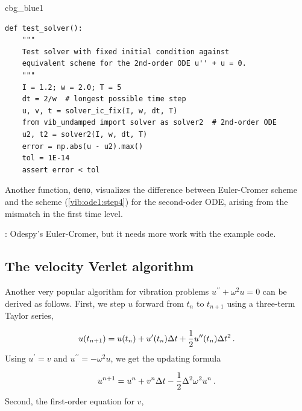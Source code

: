 \documentclass[%
oneside,                 %
final,                   %
10pt]{article}
\newenvironment{_cod_tight}[1]{
   \def\FrameCommand{\colorbox{#1}}
   \FrameRule0.6pt\MakeFramed {\FrameRestore}\vskip3mm}
   {\vskip0mm\endMakeFramed}
\newenvironment{cod}[1]{
\bgroup\rmfamily
\fboxsep=0mm\relax
\begin{_cod_tight}{#1}
\list{}{\parsep=-2mm\parskip=0mm\topsep=0pt\leftmargin=2mm
\rightmargin=2\leftmargin\leftmargin=4pt\relax}
\item\relax}
{\endlist\end{_cod_tight}\egroup}
\newcommand{\shortinlinecomment}[3]{{\color{red}{\bf #1}: #2}}
\begin{document}
\begin{cod}{cbg_blue1}\begin{Verbatim}[numbers=none,fontsize=\fontsize{9pt}{9pt},baselinestretch=0.95,xleftmargin=2mm]
def test_solver():
    """
    Test solver with fixed initial condition against
    equivalent scheme for the 2nd-order ODE u'' + u = 0.
    """
    I = 1.2; w = 2.0; T = 5
    dt = 2/w  # longest possible time step
    u, v, t = solver_ic_fix(I, w, dt, T)
    from vib_undamped import solver as solver2  # 2nd-order ODE
    u2, t2 = solver2(I, w, dt, T)
    error = np.abs(u - u2).max()
    tol = 1E-14
    assert error < tol
\end{Verbatim}
\end{cod}
\noindent

Another function, \texttt{demo},
visualizes the difference between Euler-Cromer scheme and the scheme
(\ref{vib:ode1:step4})
for the second-oder ODE, arising from the mismatch in the first time level.

\shortinlinecomment{hpl 7}{ Odespy's Euler-Cromer, but it needs more work with the example code. }{ Odespy's Euler-Cromer, but it }





\subsection{The velocity Verlet algorithm}

Another very popular algorithm for vibration problems $u^{\prime\prime}+\omega^2u=0$
can be derived as follows. First, we step $u$ forward from $t_n$ to
$t_{n+1}$ using a three-term Taylor series,

\[ u(t_{n+1}) = u(t_n) + u^{\prime}(t_n)\Delta t + \frac{1}{2}u^{\prime\prime}(t_n)\Delta t^2\tp\]
Using $u^{\prime}=v$ and $u^{\prime\prime}=-\omega^2u$, we get the updating formula

\[ u^{n+1} = u^n + v^n\Delta t - \frac{1}{2}\Delta^2\omega^2u^n\tp\]
Second, the first-order equation for $v$,
\end{document}
